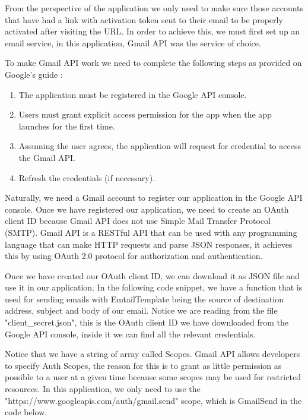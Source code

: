 \documentclass[singlespacing,12pt,parskip,headsepline,consistentlayout]{article}
\begin{document}
From the perspective of the application we only need to make sure those accounts that have had a link with activation token sent to their email to be properly activated after visiting the URL. In order to achieve this, we must first set up an email service, in this application, Gmail API was the service of choice.

To make Gmail API work we need to complete the following steps as provided on Google's guide \cite{gmailApiAuthDocs}:

    \begin{enumerate}
    \item The application must be registered in the Google API console.
    \item Users must grant explicit access permission for the app when the app launches for the first time.
    \item Assuming the user agrees, the application will request for credential to access the Gmail API.
    \item Refresh the credentials (if necessary).
\end{enumerate}

Naturally, we need a Gmail account to register our application in the Google API console. Once we have registered our application, we need to create an OAuth client ID because Gmail API does not use Simple Mail Transfer Protocol (SMTP). Gmail API is a RESTful API that can be used with any programming language that can make HTTP requests and parse JSON responses, it achieves this by using OAuth 2.0 protocol for authorization and authentication.

Once we have created our OAuth client ID, we can download it as JSON file and use it in our application. In the following code snippet, we have a function that is used for sending emails with EmtailTemplate being the source of destination address, subject and body of our email. Notice we are reading from the file "client\_secret.json", this is the OAuth client ID we have downloaded from the Google API console, inside it we can find all the relevant credentials.

Notice that we have a string of array called Scopes. Gmail API allows developers to specify Auth Scopes, the reason for this is to grant as little permission as possible to a user at a given time because some scopes may be used for restricted resources. \cite{gmailapiDocs} In this application, we only need to use the "https://www.googleapis.com/auth/gmail.send" scope, which is GmailSend in the code below.
\end{document}
